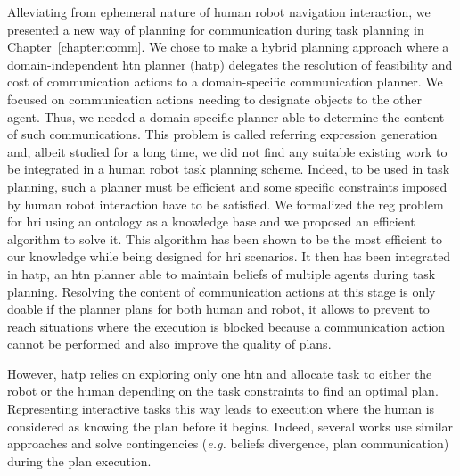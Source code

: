 \documentclass[a4paper,11pt,twoside]{StyleThese}
\begin{document}
Alleviating from ephemeral nature of human robot navigation interaction, we presented a new way of planning for communication during task planning in Chapter~\ref{chapter:comm}. We chose to make a hybrid planning approach where a domain-independent \acrshort{htn} planner (\acrshort{hatp}) delegates the resolution of feasibility and cost of communication actions to a domain-specific communication planner. We focused on communication actions needing to designate objects to the other agent. Thus, we needed a domain-specific planner able to determine the content of such communications. This problem is called referring expression generation and, albeit studied for a long time, we did not find any suitable existing work to be integrated in a human robot task planning scheme. Indeed, to be used in task planning, such a planner must be efficient and some specific constraints imposed by human robot interaction have to be satisfied. We formalized the \acrshort{reg} problem for \acrshort{hri} using an ontology as a knowledge base and we proposed an efficient algorithm to solve it. This algorithm has been shown to be the most efficient to our knowledge while being designed for \acrshort{hri} scenarios. It then has been integrated in \acrshort{hatp}, an \acrshort{htn} planner able to maintain beliefs of multiple agents during task planning. Resolving the content of communication actions at this stage is only doable if the planner plans for both human and robot, it allows to prevent to reach situations where the execution is blocked because a communication action cannot be performed and also improve the quality of plans.

However, \acrshort{hatp} relies on exploring only one \acrfull{htn} and allocate task to either the robot or the human depending on the task constraints to find an optimal plan. Representing interactive tasks this way leads to execution where the human is considered as knowing the plan before it begins. Indeed, several works use similar approaches and solve contingencies (\textit{e.g.} beliefs divergence, plan communication) during the plan execution. 
\end{document}
